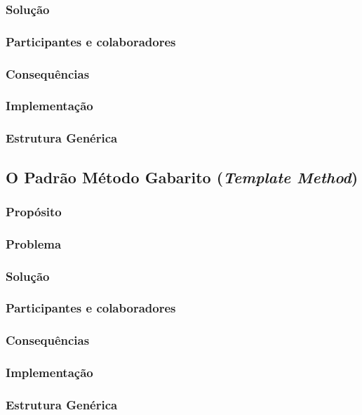 \documentclass[
	11pt,				%
	openright,
	twoside,			%
	a4paper,			%
	english,			%
	french,
	brazil,				%
	sumario=tradicional
	]{abntex2}
\begin{document}
\subsubsection{Solução}
\subsubsection{Participantes e colaboradores}
\subsubsection{Consequências}
\subsubsection{Implementação}
\subsubsection{Estrutura Genérica}

\subsection{O Padrão Método Gabarito (\textit{Template Method})}
\subsubsection{Propósito}
\subsubsection{Problema}
\subsubsection{Solução}
\subsubsection{Participantes e colaboradores}
\subsubsection{Consequências}
\subsubsection{Implementação}
\subsubsection{Estrutura Genérica}
\end{document}
